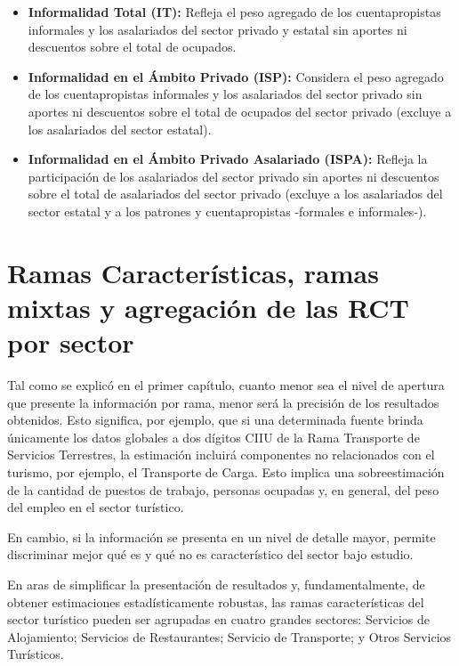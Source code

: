 \documentclass[
  openany]{book}
\begin{document}
\begin{itemize}
\item
  \textbf{Informalidad Total (IT):} Refleja el peso agregado de los cuentapropistas informales y los asalariados del sector privado y estatal sin aportes ni descuentos sobre el total de ocupados.
\item
  \textbf{Informalidad en el Ámbito Privado (ISP):} Considera el peso agregado de los cuentapropistas informales y los asalariados del sector privado sin aportes ni descuentos sobre el total de ocupados del sector privado (excluye a los asalariados del sector estatal).
\item
  \textbf{Informalidad en el Ámbito Privado Asalariado (ISPA):} Refleja la participación de los asalariados del sector privado sin aportes ni descuentos sobre el total de asalariados del sector privado (excluye a los asalariados del sector estatal y a los patrones y cuentapropistas -formales e informales-).
\end{itemize}

\hypertarget{ramas-caracteruxedsticas-ramas-mixtas-y-agregaciuxf3n-de-las-rct-por-sector}{%
\section{Ramas Características, ramas mixtas y agregación de las RCT por sector}\label{ramas-caracteruxedsticas-ramas-mixtas-y-agregaciuxf3n-de-las-rct-por-sector}}

Tal como se explicó en el primer capítulo, cuanto menor sea el nivel de apertura que presente la información por rama, menor será la precisión de los resultados obtenidos.
Esto significa, por ejemplo, que si una determinada fuente brinda únicamente los datos globales a dos dígitos CIIU de la Rama Transporte de Servicios Terrestres, la estimación incluirá componentes no relacionados con el turismo, por ejemplo, el Transporte de Carga.
Esto implica una sobreestimación de la cantidad de puestos de trabajo, personas ocupadas y, en general, del peso del empleo en el sector turístico.

En cambio, si la información se presenta en un nivel de detalle mayor, permite discriminar mejor qué es y qué no es característico del sector bajo estudio.

En aras de simplificar la presentación de resultados y, fundamentalmente, de obtener estimaciones estadísticamente robustas, las ramas características del sector turístico pueden ser agrupadas en cuatro grandes sectores: Servicios de Alojamiento; Servicios de Restaurantes; Servicio de Transporte; y Otros Servicios Turísticos.
\end{document}
